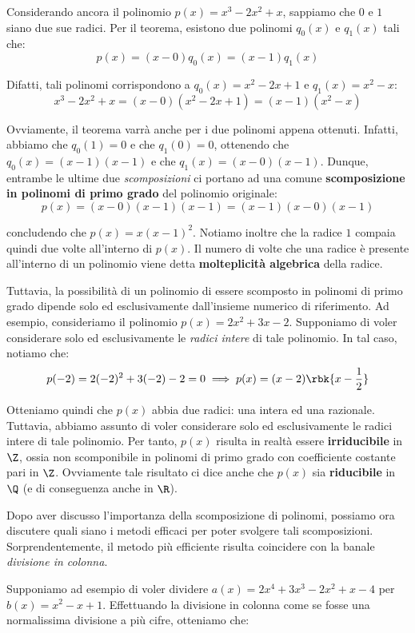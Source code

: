 \documentclass[a4paper, 12pt]{report}
\begin{document}
    Considerando ancora il polinomio $p(x) = x^3-2x^2+x$, sappiamo che $0$ e $1$ siano due sue radici. Per il teorema, esistono due polinomi $q_0(x)$ e $q_1(x)$ tali che:
    \[p(x) = (x-0) q_0(x) = (x-1) q_1(x)\]

    Difatti, tali polinomi corrispondono a $q_0(x) = x^2-2x+1$ e $q_1(x) = x^2-x$:
    \[x^3-2x^2+x = (x-0)(x^2-2x+1) = (x-1)(x^2-x)\]

    Ovviamente, il teorema varrà anche per i due polinomi appena ottenuti. Infatti, abbiamo che $q_0(1) = 0$ e che $q_1(0) = 0$, ottenendo che $q_0(x) = (x-1)(x-1)$ e che $q_1(x) = (x-0)(x-1)$. Dunque, entrambe le ultime due \textit{scomposizioni} ci portano ad una comune \textbf{scomposizione in polinomi di primo grado} del polinomio originale:
    \[p(x) = (x-0)(x-1)(x-1) = (x-1)(x-0)(x-1)\]

    concludendo che $p(x) = x(x-1)^2$. Notiamo inoltre che la radice $1$ compaia quindi due volte all'interno di $p(x)$. Il numero di volte che una radice è presente all'interno di un polinomio viene detta \textbf{molteplicità algebrica} della radice.

    Tuttavia, la possibilità di un polinomio di essere scomposto in polinomi di primo grado dipende solo ed esclusivamente dall'insieme numerico di riferimento. Ad esempio, consideriamo il polinomio $p(x) = 2 x^2 + 3 x - 2$. Supponiamo di voler considerare solo ed esclusivamente le \textit{radici intere} di tale polinomio. In tal caso, notiamo che:
    \[p(-2) = 2(-2)^2 + 3(-2) -2 = 0 \implies p(x) = (x-2)\rbk{x-\frac{1}{2}}\]

    Otteniamo quindi che $p(x)$ abbia due radici: una intera ed una razionale. Tuttavia, abbiamo assunto di voler considerare solo ed esclusivamente le radici intere di tale polinomio. Per tanto, $p(x)$ risulta in realtà essere \textbf{irriducibile} in $\Z$, ossia non scomponibile in polinomi di primo grado con coefficiente costante pari in $\Z$. Ovviamente tale risultato ci dice anche che $p(x)$ sia \textbf{riducibile} in $\Q$ (e di conseguenza anche in $\R$).

    Dopo aver discusso l'importanza della scomposizione di polinomi, possiamo ora discutere quali siano i metodi efficaci per poter svolgere tali scomposizioni. Sorprendentemente, il metodo più efficiente risulta coincidere con la banale \textit{divisione in colonna}.

    Supponiamo ad esempio di voler dividere $a(x) = 2x^4+3x^3-2x^2+x-4$ per $b(x) = x^2-x+1$. Effettuando la divisione in colonna come se fosse una normalissima divisione a più cifre, otteniamo che:
\end{document}
